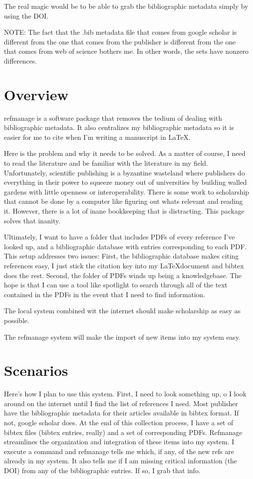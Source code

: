 \documentclass[letterpaper,12pt]{article}
\begin{document}
The real magic would be to be able to grab the bibliographic metadata simply by using the DOI.

NOTE: The fact that the .bib metadata file that comes from google scholar is different from the one that comes from the publisher is different from the one that comes from web of science bothers me. In other words, the sets have nonzero differences.

\section{Overview}
refmanage is a software package that removes the tedium of dealing with bibliographic metadata. It also centralizes my bibliographic metadata so it is easier for me to cite when I'm writing a manuscript in \LaTeX.

Here is the problem and why it needs to be solved. As a matter of course, I need to read the literature and be familiar with the literature in my field. Unfortunately, scientific publishing is a byzantine wasteland where publishers do everything in their power to squeeze money out of universities by building walled gardens with little openness or interoperability. There is some work to scholarship that cannot be done by a computer like figuring out whats relevant and reading it. However, there is a lot of inane bookkeeping that is distracting. This package solves that inanity.

Ultimately, I want to have a folder that includes PDFs of every reference I've looked up, and a bibliographic database with entries corresponding to each PDF. This setup addresses two issues: First, the bibliographic database makes citing references easy, I just stick the citation key into my \LaTeX document and bibtex does the rest. Second, the folder of PDFs winds up being a knowledgebase. The hope is that I can use a tool like spotlight to search through all of the text contained in the PDFs in the event that I need to find information.

The local system combined wit the internet should make scholarship as easy as possible.

The refmanage system will make the import of new items into my system easy.

\section{Scenarios}
Here's how I plan to use this system. First, I need to look something up, o I look around on the internet until I find the list of references I need. Most publisher have the bibliographic metadata for their articles available in bibtex format. If not, google scholar does. At the end of this collection process, I have a set of bibtex files (bibtex entries, really) and a set of corresponding PDFs. Refmanage streamlines the organization and integration of these items into my system. I execute a command and refmanage tells me which, if any, of the new refs are already in my system. It also tells me if I am missing critical information (the DOI) from any of the bibliographic entries. If so, I grab that info.
\end{document}
